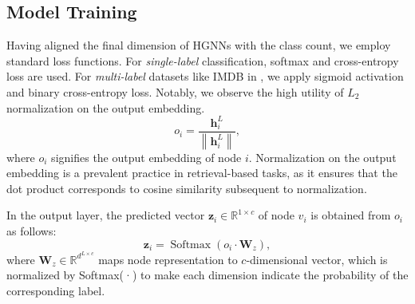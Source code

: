 \subsection{Model Training} \label{sec:MT}
Having aligned the final dimension of HGNNs with the class count, we employ standard loss functions. 
For \emph{single-label} classification, softmax and cross-entropy loss are used. 
For \emph{multi-label} datasets like IMDB in \alg, we apply sigmoid activation and binary cross-entropy loss. 
Notably, we observe the high utility of $L_{2}$ normalization on the output embedding.
\begin{equation}
{o}_i=\frac{\mathbf{h}_i^{L}}{\left\|\mathbf{h}_i^{L}\right\|},
\label{eq:normalization}
\end{equation}
where ${o}_i$ signifies the output embedding of node $i$. Normalization on the output embedding is a prevalent practice in retrieval-based tasks, as it ensures that the dot product corresponds to cosine similarity subsequent to normalization.

In the output layer, the predicted vector $\mathbf{z}_{i} \in \mathbb{R}^{1 \times c}$ of node $v_{i}$ is obtained from ${o}_i$ as follows:
\begin{equation}
    \mathbf{z}_i=\operatorname{Softmax}\left({o}_i \cdot \mathbf{W}_z\right) %
    \label{eq:z},
\end{equation}
where $\mathbf{W}_{z} \in \mathbb{R}^{d^{L \times c}}$ maps node representation to $c$-dimensional vector, which is normalized by Softmax(·) to make each dimension indicate the probability of the corresponding label.

